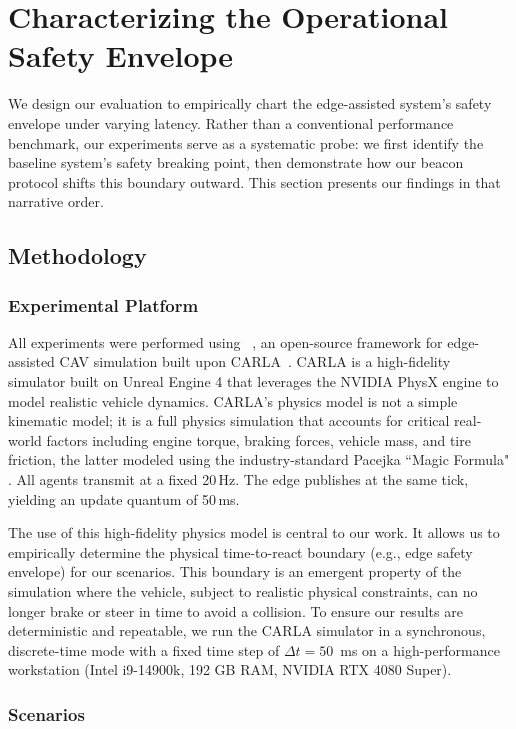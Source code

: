 \section{Characterizing the Operational Safety Envelope}
\label{sec:eval}

We design our evaluation to empirically chart the edge-assisted system’s safety envelope under varying latency. Rather than a conventional performance benchmark, our experiments serve as a systematic probe: we first identify the baseline system’s safety breaking point, then demonstrate how our beacon protocol shifts this boundary outward. This section presents our findings in that narrative order.

\subsection{Methodology}
\subsubsection{Experimental Platform}
All experiments were performed using \ecav~\cite{eCAV}, an open-source framework for edge-assisted CAV simulation built upon CARLA~\cite{dosovitskiy_carla_nodate}. CARLA is a high-fidelity simulator built on Unreal Engine 4 that leverages the NVIDIA PhysX engine to model realistic vehicle dynamics. CARLA's physics model is not a simple kinematic model; it is a full physics simulation that accounts for critical real-world factors including engine torque, braking forces, vehicle mass, and tire friction, the latter modeled using the industry-standard Pacejka ``Magic Formula" \cite{pacejka-book}. All agents transmit at a fixed 20\,Hz. The edge publishes at the same tick, yielding an update quantum of 50\,ms.

The use of this high-fidelity physics model is central to our work. It allows us to empirically determine the physical time-to-react boundary (e.g., edge safety envelope) for our scenarios. This boundary is an emergent property of the simulation where the vehicle, subject to realistic physical constraints, can no longer brake or steer in time to avoid a collision. To ensure our results are deterministic and repeatable, we run the CARLA simulator in a synchronous, discrete-time mode with a fixed time step of $\Delta t = 50$~ms on a high-performance workstation (Intel i9-14900k, 192 GB RAM, NVIDIA RTX 4080 Super).

\subsubsection{Scenarios}

